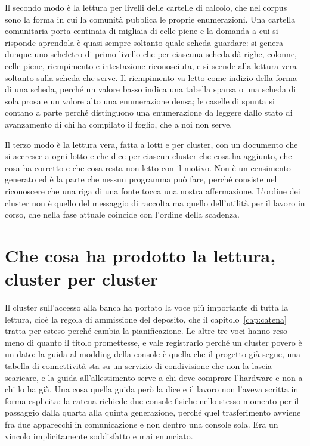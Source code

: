 Il secondo modo è la lettura per livelli delle cartelle di calcolo, che nel corpus sono la forma in cui la comunità pubblica le proprie enumerazioni. Una cartella comunitaria porta centinaia di migliaia di celle piene e la domanda a cui si risponde aprendola è quasi sempre soltanto quale scheda guardare: si genera dunque uno scheletro di primo livello che per ciascuna scheda dà righe, colonne, celle piene, riempimento e intestazione riconosciuta, e si scende alla lettura vera soltanto sulla scheda che serve. Il riempimento va letto come indizio della forma di una scheda, perché un valore basso indica una tabella sparsa o una scheda di sola prosa e un valore alto una enumerazione densa; le caselle di spunta si contano a parte perché distinguono una enumerazione da leggere dallo stato di avanzamento di chi ha compilato il foglio, che a noi non serve.

Il terzo modo è la lettura vera, fatta a lotti e per cluster, con un documento che si accresce a ogni lotto e che dice per ciascun cluster che cosa ha aggiunto, che cosa ha corretto e che cosa resta non letto con il motivo. Non è un censimento generato ed è la parte che nessun programma può fare, perché consiste nel riconoscere che una riga di una fonte tocca una nostra affermazione. L'ordine dei cluster non è quello del messaggio di raccolta ma quello dell'utilità per il lavoro in corso, che nella fase attuale coincide con l'ordine della scadenza.

\section{Che cosa ha prodotto la lettura, cluster per cluster}

Il cluster sull'accesso alla banca ha portato la voce più importante di tutta la lettura, cioè la regola di ammissione del deposito, che il capitolo~\ref{cap:catena} tratta per esteso perché cambia la pianificazione. Le altre tre voci hanno reso meno di quanto il titolo promettesse, e vale registrarlo perché un cluster povero è un dato: la guida al modding della console è quella che il progetto già segue, una tabella di connettività sta su un servizio di condivisione che non la lascia scaricare, e la guida all'allestimento serve a chi deve comprare l'hardware e non a chi lo ha già. Una cosa quella guida però la dice e il lavoro non l'aveva scritta in forma esplicita: la catena richiede due console fisiche nello stesso momento per il passaggio dalla quarta alla quinta generazione, perché quel trasferimento avviene fra due apparecchi in comunicazione e non dentro una console sola. Era un vincolo implicitamente soddisfatto e mai enunciato.

